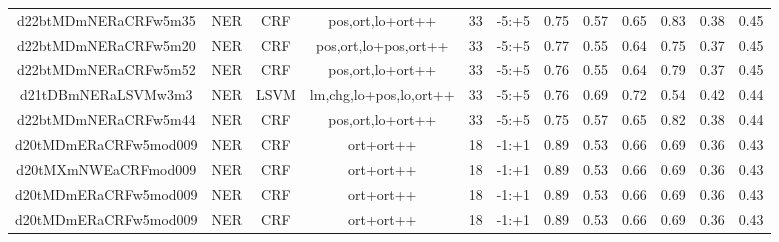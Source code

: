 \documentclass[a4paper]{article}
\begin{document}
\begin{landscape}
\begin{center}
\begin{tabular}{ |c|c|c|c|c|c|c|c|c|c|c|c|}
 	
 
 	
 		
 		\small{ d22btMDmNERaCRFw5m35 } & NER & CRF & pos,ort,lo+ort++  &  33 &  -5:+5  &  0.75 & 0.57 & 0.65  &  0.83 & 0.38 & 0.45 \\
 		

 	
 
 	
 		
 		\small{ d22btMDmNERaCRFw5m20 } & NER & CRF & pos,ort,lo+pos,ort++  &  33 &  -5:+5  &  0.77 & 0.55 & 0.64  &  0.75 & 0.37 & 0.45 \\
 		

 	
 
 	
 		
 		\small{ d22btMDmNERaCRFw5m52 } & NER & CRF & pos,ort,lo+ort++  &  33 &  -5:+5  &  0.76 & 0.55 & 0.64  &  0.79 & 0.37 & 0.45 \\
 		

 	
 
 	
 		
 		\small{ d21tDBmNERaLSVMw3m3 } & NER & LSVM & lm,chg,lo+pos,lo,ort++  &  33 &  -5:+5  &  0.76 & 0.69 & 0.72  &  0.54 & 0.42 & 0.44 \\
 		

 	
 
 	
 		
 		\small{ d22btMDmNERaCRFw5m44 } & NER & CRF & pos,ort,lo+ort++  &  33 &  -5:+5  &  0.75 & 0.57 & 0.65  &  0.82 & 0.38 & 0.44 \\
 		

 	
 
 	
 		
 		\small{ d20tMDmERaCRFw5mod009 } & NER & CRF & ort+ort++  &  18 &  -1:+1  &  0.89 & 0.53 & 0.66  &  0.69 & 0.36 & 0.43 \\
 		

 	
 
 	
 		
 		\small{ d20tMXmNWEaCRFmod009 } & NER & CRF & ort+ort++  &  18 &  -1:+1  &  0.89 & 0.53 & 0.66  &  0.69 & 0.36 & 0.43 \\
 		

 	
 
 	
 		
 		\small{ d20tMDmERaCRFw5mod009 } & NER & CRF & ort+ort++  &  18 &  -1:+1  &  0.89 & 0.53 & 0.66  &  0.69 & 0.36 & 0.43 \\
 		

 	
 
 	
 		
 		\small{ d20tMDmERaCRFw5mod009 } & NER & CRF & ort+ort++  &  18 &  -1:+1  &  0.89 & 0.53 & 0.66  &  0.69 & 0.36 & 0.43 \\
 		


\end{tabular}
\end{center}
\end{landscape}
\end{document}
